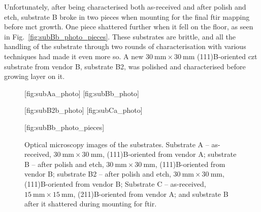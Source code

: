 Unfortunately, after being characterised both as-received and after polish and etch, substrate B broke in two pieces when mounting for the final \ac{ftir} mapping before \ac{mct} growth. One piece shattered further when it fell on the floor, as seen in Fig.~\ref{fig:subBb_photo_pieces}. These substrates are brittle, and all the handling of the substrate through two rounds of characterisation with various techniques had made it even more so. A new $\SI{30}{\milli\metre}\times\SI{30}{\milli\metre}$ (111)B-oriented \ac{czt} substrate from vendor B, substrate B2, was polished and characterised before growing  layer on it.

\begin{figure}[htbp]
    \centering
    [fig:subAa_photo]
    \hfill
    [fig:subBb_photo]
    \par\bigskip
    [fig:subB2b_photo]
    \hfill
    [fig:subCa_photo]
    \par\bigskip
    [fig:subBb_photo_pieces]
    \caption[Optical microscopy images of the substrates.]{Optical microscopy images of the substrates.  Substrate A -- as-received, $\SI{30}{\milli\metre}\times\SI{30}{\milli\metre}$, (111)B-oriented from vendor A;  substrate B -- after polish and etch, $\SI{30}{\milli\metre}\times\SI{30}{\milli\metre}$, (111)B-oriented from vendor B;  substrate B2 -- after polish and etch, $\SI{30}{\milli\metre}\times\SI{30}{\milli\metre}$, (111)B-oriented from vendor B;  Substrate C -- as-received, $\SI{15}{\milli\metre}\times\SI{15}{\milli\metre}$, (211)B-oriented from vendor A; and  substrate B after it shattered during mounting for \ac{ftir}.}
    \label{fig:substrateABC}
\end{figure}

